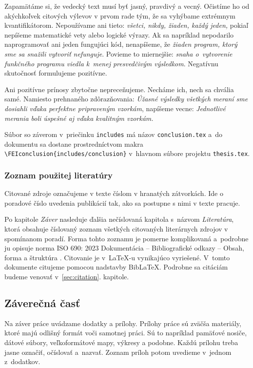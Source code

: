 Zapamätáme si, že vedecký text musí byť jasný, pravdivý a vecný.
Očistíme ho od akýchkoľvek citových výlevov v prvom rade tým,
že sa vyhýbame extrémnym kvantifikátorom. Nepoužívame ani tieto:
\emph{všetci, nikdy, žiaden, každý jeden,}
pokiaľ nepíšeme matematické vety alebo logické výrazy.
Ak sa napríklad nepodarilo naprogramovať ani jeden fungujúci kód,
nenapíšeme,
že \emph{žiaden program, ktorý sme sa snažili vytvoriť nefunguje}.
Povieme to miernejšie: \emph{snaha o~vytvorenie funkčného
programu viedla k~menej presvedčivým výsledkom}.
Negatívnu skutočnosť formulujeme pozitívne.

Ani pozitívne prínosy zbytočne nepreceňujeme.
Necháme ich, nech sa chvália samé.
Namiesto prehnaného zdôrazňovania:
\emph{Úžasné výsledky všetkých meraní sme dosiahli
vďaka perfektne pripraveným vzorkám},
napíšeme vecne:
\emph{Jednotlivé merania boli úspešné aj
vďaka kvalitným vzorkám.}

Súbor so záverom v~priečinku \verb|includes| má
názov \verb|conclusion.tex|
a~do dokumentu sa dostane prostredníctvom makra
\verb|\FEIconclusion{includes/conclusion}|
v~hlavnom súbore projektu \verb|thesis.tex|.

\subsubsection{Zoznam použitej literatúry}
Citované zdroje označujeme v texte číslom v hranatých zátvorkách. Ide o poradové číslo uvedenia publikácií tak, ako sa postupne s nimi v texte pracuje.

Po kapitole \emph{Záver} nasleduje ďalšia nečíslovaná kapitola
s~názvom \emph{Literatúra},
ktorá obsahuje číslovaný zoznam všetkých
citovaných literárnych zdrojov v spomínanom poradí.
Forma tohto zoznamu je pomerne komplikovaná a~podrobne
ju opisuje norma ISO 690: 2023 Dokumentácia -- Bibliografické odkazy -- Obsah, forma a štruktúra \cite{iso690}.
Citovanie je v~\LaTeX-u vynikajúco vyriešené.
V~tomto dokumente citujeme pomocou nadstavby Bib\LaTeX.
Podrobne sa citáciám budeme venovať v~\ref{sec:citation}. kapitole.

\subsection{Záverečná časť}
Na záver práce uvádzame dodatky a prílohy.
Prílohy práce sú zväčša materiály,
ktoré majú odlišný formát voči samotnej práci.
Sú to napríklad pamäťové nosiče,
dátové súbory, veľkoformátové mapy, výkresy a podobne.
Každú prílohu treba jasne označiť, očíslovať a~nazvať.
Zoznam príloh potom uvedieme v~jednom z~dodatkov.

